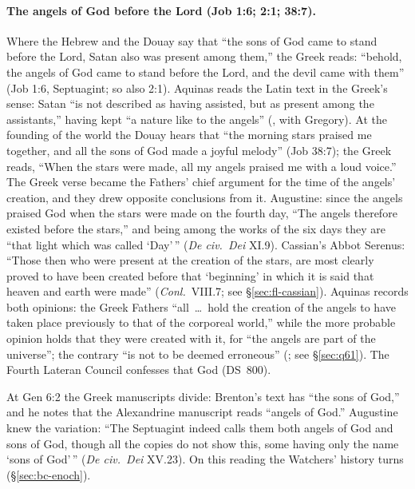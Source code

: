 \paragraph{The angels of God before the Lord (Job 1:6; 2:1; 38:7).} Where
the Hebrew and the Douay say that ``the sons of God came to stand before the
Lord, Satan also was present among them,'' the Greek reads: ``behold, the
angels of God came to stand before the Lord, and the devil came with
them'' (Job 1:6, Septuagint; so also 2:1). Aquinas reads the Latin text in
the Greek's sense: Satan ``is not described as having assisted, but as
present among the assistants,'' having kept ``a nature like to the angels''
(, with Gregory). At the founding of the world the
Douay hears that ``the morning stars praised me together, and all the sons
of God made a joyful melody'' (Job 38:7); the Greek reads, ``When the stars
were made, all my angels praised me with a loud voice.'' The Greek verse
became the Fathers' chief argument for the time of the angels' creation,
and they drew opposite conclusions from it. Augustine: since the angels
praised God when the stars were made on the fourth day, ``The angels
therefore existed before the stars,'' and being among the works of the six
days they are ``that light which was called `Day'\,'' (\emph{De civ.\ Dei}
XI.9). Cassian's Abbot Serenus: ``Those then who were present at the
creation of the stars, are most clearly proved to have been created before
that `beginning' in which it is said that heaven and earth were made''
(\emph{Conl.}\ VIII.7; see \S\ref{sec:fl-cassian}). Aquinas records both
opinions: the Greek Fathers ``all~\dots\ hold the
creation of the angels to have taken place previously to that of the
corporeal world,'' while the more probable opinion holds that they were
created with it, for ``the angels are part of the universe''; the contrary
``is not to be deemed erroneous'' (; see \S\ref{sec:q61}).
The Fourth Lateran Council confesses that God  (DS~800).

At Gen 6:2 the Greek manuscripts divide: Brenton's text has ``the sons of
God,'' and he notes that the Alexandrine manuscript reads ``angels of God.''
Augustine knew the variation: ``The Septuagint indeed calls them both angels
of God and sons of God, though all the copies do not show this, some having
only the name `sons of God'\,'' (\emph{De civ.\ Dei} XV.23). On this reading
the Watchers' history turns (\S\ref{sec:bc-enoch}).

